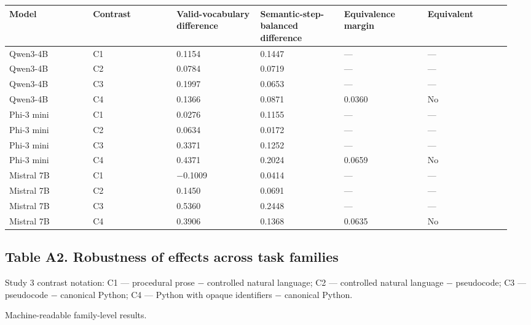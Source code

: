 \documentclass[sn-mathphys-num]{sn-jnl}
\begin{document}
\begin{table}[!htbp]
\centering\scriptsize
\begin{tabular}{|p{0.158\linewidth}|p{0.158\linewidth}|p{0.158\linewidth}|p{0.158\linewidth}|p{0.158\linewidth}|p{0.158\linewidth}|}
\hline
Model & Contrast & Valid-vocabulary difference & Semantic-step-balanced difference & Equivalence margin & Equivalent \\ \hline
Qwen3-4B & C1 & 0.1154 & 0.1447 & — & — \\ \hline
Qwen3-4B & C2 & 0.0784 & 0.0719 & — & — \\ \hline
Qwen3-4B & C3 & 0.1997 & 0.0653 & — & — \\ \hline
Qwen3-4B & C4 & 0.1366 & 0.0871 & 0.0360 & No \\ \hline
Phi-3 mini & C1 & 0.0276 & 0.1155 & — & — \\ \hline
Phi-3 mini & C2 & 0.0634 & 0.0172 & — & — \\ \hline
Phi-3 mini & C3 & 0.3371 & 0.1252 & — & — \\ \hline
Phi-3 mini & C4 & 0.4371 & 0.2024 & 0.0659 & No \\ \hline
Mistral 7B & C1 & $-$0.1009 & 0.0414 & — & — \\ \hline
Mistral 7B & C2 & 0.1450 & 0.0691 & — & — \\ \hline
Mistral 7B & C3 & 0.5360 & 0.2448 & — & — \\ \hline
Mistral 7B & C4 & 0.3906 & 0.1368 & 0.0635 & No \\ \hline
\end{tabular}
\end{table}

\subsection*{Table A2. Robustness of effects across task families}

Study 3 contrast notation: C1 — procedural prose $-$ controlled natural language; C2 — controlled natural language $-$ pseudocode; C3 — pseudocode $-$ canonical Python; C4 — Python with opaque identifiers $-$ canonical Python.

Machine-readable family-level results.
\end{document}
